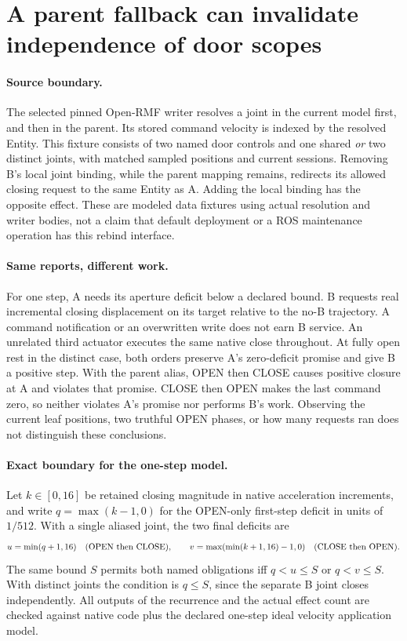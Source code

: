 \documentclass{article}
\begin{document}
\section*{A parent fallback can invalidate independence of door scopes}
\paragraph{Source boundary.}
The selected pinned Open-RMF writer resolves a joint in the current
model first, and then in the parent. Its stored command velocity is
indexed by the resolved Entity. This fixture consists of two named
door controls and one shared \emph{or} two distinct joints, with
matched sampled positions and current sessions. Removing B's local
joint binding, while the parent mapping remains, redirects its
allowed closing request to the same Entity as A. Adding the local
binding has the opposite effect. These are modeled data fixtures
using actual resolution and writer bodies, not a claim that default
deployment or a ROS maintenance operation has this rebind interface.

\paragraph{Same reports, different work.}
For one step, A needs its aperture deficit below a declared bound.
B requests real incremental closing displacement on its target
relative to the no-B trajectory. A command notification or an
overwritten write does not earn B service. An unrelated third
actuator executes the same native close throughout.
At fully open rest in the distinct case, both orders preserve A's
zero-deficit promise and give B a positive step. With the parent
alias, OPEN then CLOSE causes positive closure at A and violates
that promise. CLOSE then OPEN makes the last command zero, so
neither violates A's promise nor performs B's work. Observing
the current leaf positions, two truthful OPEN phases, or how many
requests ran does not distinguish these conclusions.

\paragraph{Exact boundary for the one-step model.}
Let $k\in[0,16]$ be retained closing magnitude in native
acceleration increments, and write $q=\max(k-1,0)$ for the
OPEN-only first-step deficit in units of $1/512$. With a single
aliased joint, the two final deficits are
\[
  u=\min(q+1,16) \quad\hbox{(OPEN then CLOSE)},\qquad
  v=\max(\min(k+1,16)-1,0) \quad\hbox{(CLOSE then OPEN)}.
\]
The same bound $S$ permits both named obligations iff $q<u\le S$
or $q<v\le S$. With distinct joints the condition is $q\le S$, since the
separate B joint closes independently. All outputs of the recurrence
and the actual effect count are checked against native code plus the
declared one-step ideal velocity application model.
\end{document}
